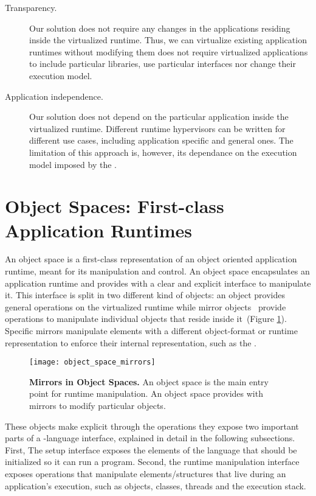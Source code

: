 \begin{description}
\item[Transparency.] Our solution does not require any changes in the applications residing inside the virtualized runtime. Thus, we can virtualize existing application runtimes without modifying them \ie \Vtt does not require virtualized applications to include particular libraries, use particular interfaces nor change their execution model.

\item[Application independence.] Our solution does not depend on the particular application inside the virtualized runtime. Different runtime hypervisors can be written for different use cases, including application specific and general ones. The limitation of this approach is, however, its dependance on the execution model imposed by the \VM.
\end{description}

\section{Object Spaces: First-class Application Runtimes} \label{sec:object_space}

An object space is a first-class representation of an object oriented application runtime, meant for its manipulation and control. An object space encapsulates an application runtime and provides with a clear and explicit interface to manipulate it. This interface is split in two different kind of objects: an  object provides general operations on the virtualized runtime while mirror objects~\cite{Brac04b} provide operations to manipulate individual objects that reside inside it~(Figure \ref{fig:objectSpaceMirrors}). Specific mirrors manipulate elements with a different object-format or runtime representation to enforce their internal representation, such as the .

\begin{figure}[ht]
\begin{center}
\texttt{[image: object\_space\_mirrors]}
\caption{\textbf{Mirrors in Object Spaces.} An object space is the main entry point for runtime manipulation. An object space provides with mirrors to modify particular objects. \label{fig:objectSpaceMirrors}}
\end{center}
\end{figure}

These objects make explicit through the operations they expose two important parts of a \VM-language interface, explained in detail in the following subsections. First, The \VM setup interface exposes the elements of the language that should be initialized so it can run a program. Second, the runtime manipulation interface exposes operations that manipulate elements/structures that live during an application's execution, such as objects, classes, threads and the execution stack.

